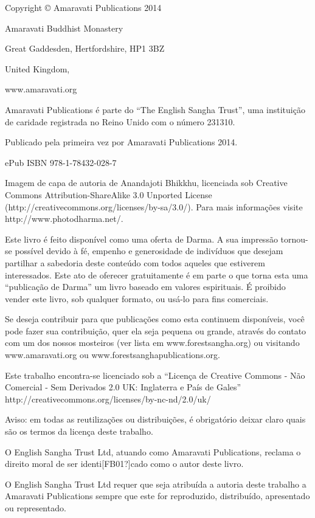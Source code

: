 
Copyright © Amaravati Publications 2014

Amaravati Buddhist Monastery

Great Gaddesden, Hertfordshire, HP1 3BZ

United Kingdom,

www.amaravati.org

Amaravati Publications é parte do “The English Sangha Trust”, uma
instituição de caridade registrada no Reino Unido com o número 231310.

Publicado pela primeira vez por Amaravati Publications 2014.

ePub ISBN 978-1-78432-028-7

Imagem de capa de autoria de Anandajoti Bhikkhu, licenciada sob Creative
Commons Attribution-ShareAlike 3.0 Unported License
(http://creativecommons.org/licenses/by-sa/3.0/). Para mais informações
visite http://www.photodharma.net/. 

Este livro é feito disponível como uma oferta de Darma. A sua impressão
tornou-se possível devido à fé, empenho e generosidade de indivíduos
que desejam partilhar a sabedoria deste conteúdo com todos aqueles que
estiverem interessados. Este ato de oferecer gratuitamente é em parte o
que torna esta uma “publicação de Darma” um livro baseado em valores
espirituais. É proibido vender este livro, sob qualquer formato, ou
usá-lo para fins comerciais.

Se deseja contribuir para que publicações como esta continuem
disponíveis, você pode fazer sua contribuição, quer ela seja pequena ou
grande, através do contato com um dos nossos mosteiros (ver lista em
www.forestsangha.org) ou visitando www.amaravati.org ou
www.forestsanghapublications.org.

Este trabalho encontra-se licenciado sob a “Licença de Creative Commons
- Não Comercial - Sem Derivados 2.0 UK: Inglaterra e País de Gales”
http://creativecommons.org/licenses/by-nc-nd/2.0/uk/

Aviso: em todas as reutilizações ou distribuições, é obrigatório deixar
claro quais são os termos da licença deste trabalho.

O English Sangha Trust Ltd, atuando como Amaravati Publications, reclama
o direito moral de ser identi[FB01?]cado como o autor deste livro.

O English Sangha Trust Ltd requer que seja atribuída a autoria deste
trabalho a Amaravati Publications sempre que este for reproduzido,
distribuído, apresentado ou representado.

